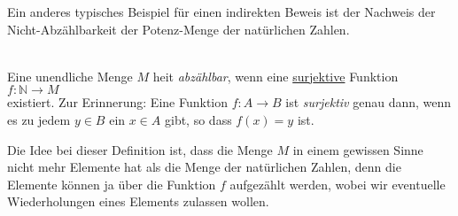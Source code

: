 Ein anderes typisches Beispiel f\"{u}r einen indirekten Beweis ist der Nachweis der
Nicht-Abz\"{a}hlbarkeit der Potenz-Menge der nat\"{u}rlichen Zahlen.

\begin{Definition} \hspace*{\fill} \\
Eine unendliche Menge $M$ hei\3t \emph{abz\"{a}hlbar}, wenn eine 
\underline{sur}j\underline{ektive} Funktion
\\[0.2cm]
\hspace*{1.3cm}
$f: \mathbb{N} \rightarrow M$
\\[0.2cm]
existiert.  Zur Erinnerung: Eine Funktion $f:A \rightarrow B$ ist \emph{surjektiv} genau
dann, wenn es zu jedem $y \in B$ ein $x \in A$ gibt, so dass $f(x) = y$ ist.
\end{Definition}

Die Idee bei dieser Definition ist, dass die Menge  $M$ in einem gewissen Sinne nicht mehr Elemente hat
als die Menge der nat\"{u}rlichen Zahlen, denn die Elemente k\"{o}nnen ja \"{u}ber die Funktion $f$
aufgez\"{a}hlt werden, wobei wir eventuelle Wiederholungen eines Elements zulassen wollen.

